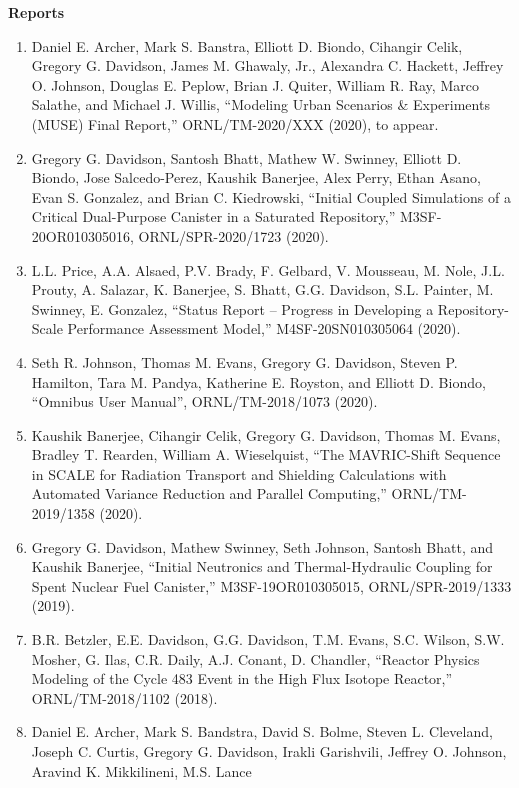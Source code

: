 \documentclass[letterpaper,11pt]{article}
\newcommand{\leftsubheading}[1]{
  \textbf{#1\vspace{-6pt} \\}}
\begin{document}
\leftsubheading{Reports}
\begin{enumerate}
  \item Daniel E. Archer, Mark S. Banstra, Elliott D. Biondo,
    Cihangir Celik, Gregory G. Davidson, James M. Ghawaly, Jr.,
    Alexandra C. Hackett, Jeffrey O. Johnson, Douglas E. Peplow, Brian
    J. Quiter, William R. Ray, Marco Salathe, and Michael J. Willis,
    ``Modeling Urban Scenarios \& Experiments (MUSE) Final Report,''
    ORNL/TM-2020/XXX (2020), to appear.
  \item Gregory G. Davidson, Santosh Bhatt, Mathew W. Swinney, Elliott
    D. Biondo, Jose Salcedo-Perez, Kaushik Banerjee, Alex Perry, Ethan
    Asano, Evan S. Gonzalez, and Brian C. Kiedrowski, ``Initial
    Coupled Simulations of a Critical Dual-Purpose Canister in a
    Saturated Repository,'' M3SF-20OR010305016, ORNL/SPR-2020/1723
    (2020). 
  \item L.L. Price, A.A. Alsaed, P.V. Brady, F. Gelbard, V. Mousseau,
    M. Nole, J.L. Prouty, A. Salazar, K. Banerjee, S. Bhatt,
    G.G. Davidson, S.L. Painter, M. Swinney, E. Gonzalez, ``Status
    Report -- Progress in Developing a Repository-Scale Performance
    Assessment Model,'' M4SF-20SN010305064 (2020).
  \item Seth R. Johnson, Thomas M. Evans, Gregory G. Davidson, Steven
    P. Hamilton, Tara M. Pandya, Katherine E. Royston, and Elliott
    D. Biondo, ``Omnibus User Manual'', ORNL/TM-2018/1073 (2020).
  \item Kaushik Banerjee, Cihangir Celik, Gregory G. Davidson,
    Thomas M. Evans, Bradley T. Rearden, William A. Wieselquist,
    ``The MAVRIC-Shift Sequence in SCALE for Radiation Transport and
    Shielding Calculations with Automated Variance Reduction and
    Parallel Computing,'' ORNL/TM-2019/1358 (2020).
  \item Gregory G. Davidson, Mathew Swinney, Seth Johnson, Santosh
    Bhatt, and Kaushik Banerjee, ``Initial Neutronics and
    Thermal-Hydraulic Coupling for Spent Nuclear Fuel Canister,''
    M3SF-19OR010305015, ORNL/SPR-2019/1333 (2019).
  \item B.R. Betzler, E.E. Davidson, G.G. Davidson, T.M. Evans,
    S.C. Wilson, S.W. Mosher, G. Ilas, C.R. Daily, A.J. Conant,
    D. Chandler, ``Reactor Physics Modeling of the Cycle 483 Event
    in the High Flux Isotope Reactor,'' ORNL/TM-2018/1102 (2018).
  \item Daniel E. Archer, Mark S. Bandstra, David S. Bolme, Steven
    L. Cleveland, Joseph C. Curtis, Gregory G. Davidson, Irakli
    Garishvili, Jeffrey O. Johnson, Aravind K. Mikkilineni, M.S. Lance

\end{enumerate}
\end{document}
